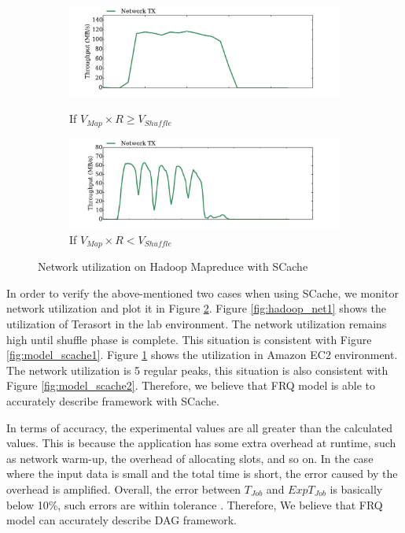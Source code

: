{\begin{figure}
	\centering
	\begin{minipage}[hb]{\linewidth}
		\begin{subfigure}{\linewidth}
			\begin{minipage}{\linewidth}
				\includegraphics[width=\linewidth]{fig/hadoop_net1}
				\caption{\color{blue}If \(V_{Map} \times R \ge V_{Shuffle}\)}
				\label{fig:hadoop_net1}
			\end{minipage}
			\begin{minipage}{\linewidth}
				\includegraphics[width=\linewidth]{fig/hadoop_net2}
				\caption{\color{blue}If \(V_{Map} \times R < V_{Shuffle}\)}
				\label{fig:hadoop_net2}
			\end{minipage}
		\end{subfigure}
		\caption{\color{blue}Network utilization on Hadoop Mapreduce with SCache}
		\label{fig:hadoop_net}
	\end{minipage}
\end{figure}

In order to verify the above-mentioned two cases when using SCache, we monitor network utilization and plot it in Figure \ref{fig:hadoop_net}. Figure \ref{fig:hadoop_net1} shows the utilization of Terasort in the lab environment. The network utilization remains high until shuffle phase is complete. This situation is consistent with Figure \ref{fig:model_scache1}. Figure \ref{fig:hadoop_net2} shows the utilization in Amazon EC2 environment. The network utilization is 5 regular peaks, this situation is also consistent with Figure \ref{fig:model_scache2}. Therefore, we believe that FRQ model is able to accurately describe framework with SCache.

In terms of accuracy, the experimental values are all greater than the calculated values. This is because the application has some extra overhead at runtime, such as network warm-up, the overhead of allocating slots, and so on. In the case where the input data is small and the total time is short, the error caused by the overhead is amplified. Overall, the error between \(T_{Job}\) and \(ExpT_{Job}\) is basically below 10\%, such errors are within tolerance . Therefore, We believe that FRQ model can accurately describe DAG framework.
}